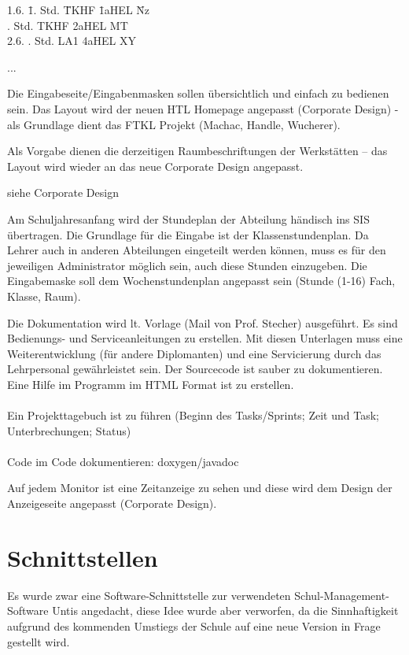 \begin{description}[style=nextline]
\begin{tabbing}
1.6. \= 1. Std. \= TKHF \= 1aHEL \hspace{2em} \= Nz\\
 . Std. \> TKHF \> 2aHEL \> MT\\
2.6. . Std. \> LA1 \> 4aHEL \> XY
\end{tabbing}
		...
	\item[Layout]
		Die Eingabeseite/Eingabenmasken
		 sollen übersichtlich und einfach zu bedienen sein. Das Layout wird der neuen HTL Homepage angepasst (Corporate Design) - als Grundlage dient das FTKL Projekt (Machac, Handle, Wucherer).\\
		\begin{description}[style=nextline]
			\item[Stundenplandesign]
				Als Vorgabe dienen die derzeitigen Raumbeschriftungen der Werkstätten – das Layout wird wieder an das neue Corporate Design angepasst.
			\item[App­Design]
				siehe Corporate Design
			\item[Stundenplaneingabe]
				Am Schuljahresanfang wird der Stundeplan der Abteilung händisch ins SIS übertragen. Die Grundlage für die Eingabe ist der Klassenstundenplan. Da Lehrer auch in anderen Abteilungen eingeteilt werden können, muss es für den jeweiligen Administrator möglich sein, auch diese Stunden einzugeben. Die Eingabemaske soll dem Wochenstundenplan angepasst sein (Stunde (1-16) Fach, Klasse, Raum).
			\item[Dokumentation]
				Die Dokumentation wird lt. Vorlage (Mail von Prof. Stecher) ausgeführt. Es sind Bedienungs- und Serviceanleitungen zu erstellen. Mit diesen Unterlagen muss eine Weiterentwicklung (für andere Diplomanten) und eine Servicierung durch das Lehrpersonal gewährleistet sein. Der Sourcecode ist sauber zu dokumentieren. Eine Hilfe im Programm im HTML Format ist zu erstellen.\\
				\\
				Ein Projekttagebuch ist zu führen (Beginn des Tasks/Sprints; Zeit und Task; Unterbrechungen; Status)\\
				\\
				Code im Code dokumentieren: doxygen/javadoc
		\end{description}
	\item[Uhranzeige]
		Auf jedem Monitor ist eine Zeitanzeige zu sehen und diese wird dem Design der Anzeigeseite angepasst (Corporate Design).
\end{description}

\section{Schnittstellen}
Es wurde zwar eine Software-Schnittstelle zur verwendeten Schul-Management-Software Untis angedacht, diese Idee wurde aber verworfen, da die Sinnhaftigkeit aufgrund des kommenden Umstiegs der Schule auf eine neue Version in Frage gestellt wird.


